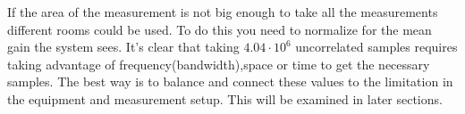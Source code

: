 If the area of the measurement is not big enough to take all the measurements different rooms could be used. To do this you need to normalize for the mean gain the system sees. It's clear that taking $4.04\cdot10^6$  uncorrelated samples requires taking advantage of  frequency(bandwidth),space or time to get the necessary samples. The best way is to balance and connect these values to the limitation in the equipment and measurement setup. This will be examined in later sections. 

